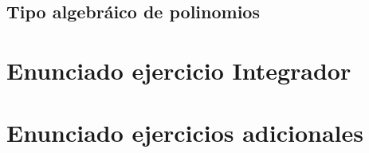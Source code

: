 \documentclass[12pt]{article}
\begin{document}


\subsection{Tipo algebráico de polinomios}



\clearpage
\appendix

\section{Enunciado ejercicio Integrador}



\section{Enunciado ejercicios adicionales}


\end{document}
